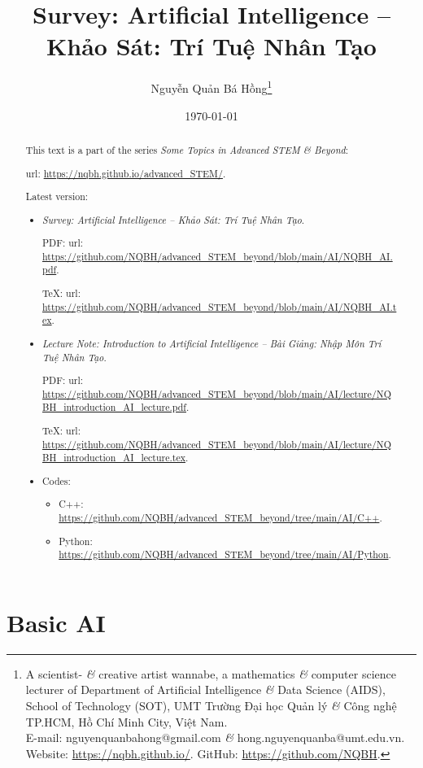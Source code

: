 \documentclass{article}
\title{Survey: Artificial Intelligence -- Khảo Sát: Trí Tuệ Nhân Tạo}
\author{Nguyễn Quản Bá Hồng\footnote{A scientist- {\it\&} creative artist wannabe, a mathematics {\it\&} computer science lecturer of Department of Artificial Intelligence {\it\&} Data Science (AIDS), School of Technology (SOT), UMT Trường Đại học Quản lý {\it\&} Công nghệ TP.HCM, Hồ Chí Minh City, Việt Nam.\\E-mail: {\sf nguyenquanbahong@gmail.com} {\it\&} {\sf hong.nguyenquanba@umt.edu.vn}. Website: \url{https://nqbh.github.io/}. GitHub: \url{https://github.com/NQBH}.}}
\date{\today}
\begin{document}
\maketitle
\begin{abstract}
	This text is a part of the series {\it Some Topics in Advanced STEM \& Beyond}:

	{\sc url}: \url{https://nqbh.github.io/advanced_STEM/}.

	Latest version:
	\begin{itemize}
		\item {\it Survey: Artificial Intelligence -- Khảo Sát: Trí Tuệ Nhân Tạo}.

		PDF: {\sc url}: \url{https://github.com/NQBH/advanced_STEM_beyond/blob/main/AI/NQBH_AI.pdf}.

		\TeX: {\sc url}: \url{https://github.com/NQBH/advanced_STEM_beyond/blob/main/AI/NQBH_AI.tex}.
		\item {\it Lecture Note: Introduction to Artificial Intelligence -- Bài Giảng: Nhập Môn Trí Tuệ Nhân Tạo}.

		PDF: {\sc url}: \url{https://github.com/NQBH/advanced_STEM_beyond/blob/main/AI/lecture/NQBH_introduction_AI_lecture.pdf}.

		\TeX: {\sc url}: \url{https://github.com/NQBH/advanced_STEM_beyond/blob/main/AI/lecture/NQBH_introduction_AI_lecture.tex}.
		\item Codes:
		\begin{itemize}
			\item C++: \url{https://github.com/NQBH/advanced_STEM_beyond/tree/main/AI/C++}.
			\item Python: \url{https://github.com/NQBH/advanced_STEM_beyond/tree/main/AI/Python}.
		\end{itemize}
	\end{itemize}
\end{abstract}
\tableofcontents


\section{Basic AI}
\end{document}
